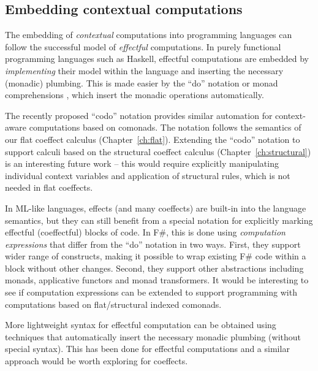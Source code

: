 
\subsection{Embedding contextual computations}
\label{sec:unified-impl-embed}

The embedding of \emph{contextual} computations into programming languages can follow the successful
model of \emph{effectful} computations. In purely functional programming languages such as Haskell, 
effectful computations are embedded by \emph{implementing} their model within the language 
and inserting the necessary (monadic) plumbing. This is made easier by the ``do'' notation or
monad comprehensions \cite{other-haskell98,monads-compre}, which insert the monadic operations 
automatically.

The recently proposed ``codo'' notation \cite{comonads-codo} provides similar automation for
context-aware computations based on comonads. The notation follows the semantics of our 
flat coeffect calculus (Chapter~\ref{ch:flat}). Extending the ``codo'' notation to support calculi based 
on the structural coeffect calculus (Chapter~\ref{ch:structural}) is an interesting future work -- 
this would require explicitly manipulating individual context variables and application of structural
rules, which is not needed in flat coeffects.

In ML-like languages, effects (and many coeffects) are built-in into the language semantics, 
but they can still benefit from a special notation for explicitly marking effectful (coeffectful) 
blocks of code. In F\#, this is done using \emph{computation expressions}  \cite{app-computation-zoo}
that differ from the ``do'' notation in two ways. First, they support wider range of 
constructs, making it possible to wrap existing F\# code within a block without other changes.
Second, they support other abstractions including monads, applicative functors and monad
transformers. It would be interesting to see if computation expressions can be extended to
support programming with computations based on flat/structural indexed comonads.

More lightweight syntax for effectful computation can be obtained using
techniques that automatically insert the necessary monadic plumbing (without
special syntax). This has been done for effectful computations \cite{monads-lightweight-ml}
and a similar approach would be worth exploring for coeffects. 

